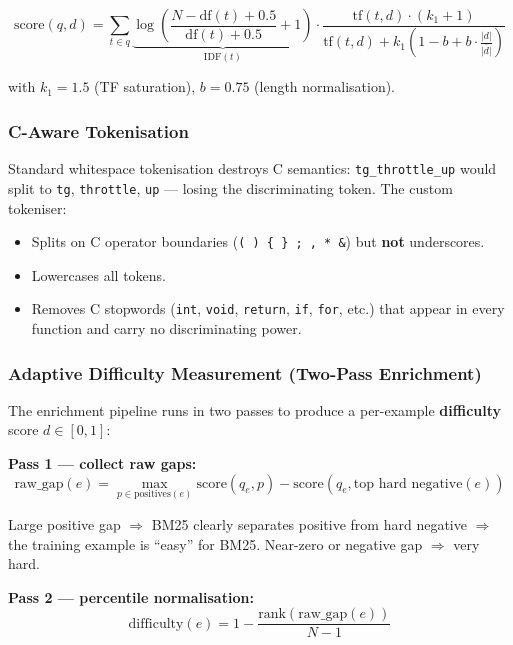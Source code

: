 \documentclass[11pt,a4paper]{article}
\begin{document}
\begin{equation}
  \text{score}(q, d) = \sum_{t \in q} \underbrace{\log\!\left(\frac{N - \mathrm{df}(t) + 0.5}{\mathrm{df}(t) + 0.5} + 1\right)}_{\mathrm{IDF}(t)} \cdot \frac{\mathrm{tf}(t,d) \cdot (k_1 + 1)}{\mathrm{tf}(t,d) + k_1\!\left(1 - b + b\cdot\tfrac{|d|}{\overline{|d|}}\right)}
\end{equation}

\noindent
with $k_1 = 1.5$ (TF saturation), $b = 0.75$ (length normalisation).

\subsubsection{C-Aware Tokenisation}

Standard whitespace tokenisation destroys C semantics:
\texttt{tg\_throttle\_up} would split to \texttt{tg}, \texttt{throttle},
\texttt{up} --- losing the discriminating token. The custom tokeniser:
\begin{itemize}[itemsep=1pt]
  \item Splits on C operator boundaries (\texttt{( ) \{ \} ; , * \&}) but
        \textbf{not} underscores.
  \item Lowercases all tokens.
  \item Removes C stopwords (\texttt{int}, \texttt{void}, \texttt{return},
        \texttt{if}, \texttt{for}, etc.) that appear in every function and
        carry no discriminating power.
\end{itemize}

\subsubsection{Adaptive Difficulty Measurement (Two-Pass Enrichment)}

The enrichment pipeline runs in two passes to produce a per-example
\textbf{difficulty} score $d \in [0, 1]$:

\textbf{Pass 1 --- collect raw gaps:}
\begin{equation}
  \text{raw\_gap}(e) = \max_{p \in \text{positives}(e)} \text{score}(q_e, p)
                     - \text{score}(q_e, \text{top hard negative}(e))
\end{equation}

Large positive gap $\Rightarrow$ BM25 clearly separates positive from
hard negative $\Rightarrow$ the training example is ``easy'' for BM25.
Near-zero or negative gap $\Rightarrow$ very hard.

\textbf{Pass 2 --- percentile normalisation:}
\begin{equation}
  \text{difficulty}(e) = 1 - \frac{\mathrm{rank}(\text{raw\_gap}(e))}{N - 1}
\end{equation}
\end{document}
